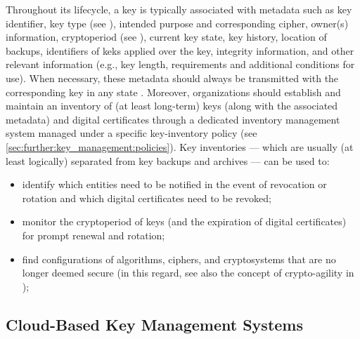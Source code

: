 Throughout its lifecycle, a key is typically associated with metadata such as key identifier, key type (see ), intended purpose and corresponding cipher, owner(s) information, cryptoperiod (see ), current key state, key history, location of backups, identifiers of \glspl{kek} applied over the key, integrity information, and other relevant information (e.g., key length, requirements and additional conditions for use). When necessary, these metadata should always be transmitted with the corresponding key in any state \cite{barker_profile_2015}. Moreover, organizations should establish and maintain an inventory of (at least long-term) keys (along with the associated metadata) and digital certificates through a dedicated inventory management system \cite{barker_recommendation_2020_p1} managed under a specific key-inventory policy (see \cref{sec:further:key_management:policies}). Key inventories --- which are usually (at least logically) separated from key backups and archives --- can be used to:

\begin{itemize}
	\item identify which entities need to be notified in the event of revocation or rotation and which digital certificates need to be revoked;
	\item monitor the cryptoperiod of keys (and the expiration of digital certificates) for prompt renewal and rotation;
	\item find configurations of algorithms, ciphers, and cryptosystems that are no longer deemed secure (in this regard, see also the concept of crypto-agility in );
\end{itemize}







\subsection{Cloud-Based Key Management Systems}\label{sec:key_management:cloud}




